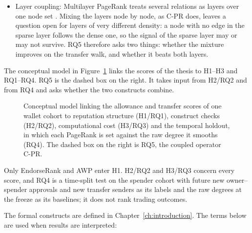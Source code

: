\begin{itemize}
\item Layer coupling: Multilayer PageRank treats several relations as layers over one node set . Mixing the layers node by node, as C-PR does, leaves a question open for layers of very different density: a node with no edge in the sparse layer follows the dense one, so the signal of the sparse layer may or may not survive. RQ5 therefore asks two things: whether the mixture improves on the transfer walk, and whether it beats both layers.
\end{itemize}

The conceptual model in Figure~\ref{fig:conceptual-model} links the scores of the thesis to H1--H3 and RQ1--RQ4. RQ5 is the dashed box on the right. It takes input from H2/RQ2 and from RQ4 and asks whether the two constructs combine.

\begin{figure}[htbp]
\centering

\caption[{Conceptual model: the allowance and transfer scores mapped to reputation structure (H1/RQ1), construct checks (H2/RQ2), computational cost (H3/RQ3), and the temporal holdout of future new approvals and senders against the raw degrees (RQ4).}]{Conceptual model linking the allowance and transfer scores of one wallet cohort to reputation structure (H1/RQ1), construct checks (H2/RQ2), computational cost (H3/RQ3) and the temporal holdout, in which each PageRank is set against the raw degree it smooths (RQ4). The dashed box on the right is RQ5, the coupled operator C-PR.}
\label{fig:conceptual-model}
\end{figure}

Only EndorseRank and AWP enter H1. H2/RQ2 and H3/RQ3 concern every score, and RQ4 is a time-split test on the spender cohort with future new owner--spender approvals and new transfer senders as its labels and the raw degrees at the freeze as its baselines; it does not rank trading outcomes.


The formal constructs are defined in Chapter~\ref{ch:introduction}. The terms below are used when results are interpreted:

